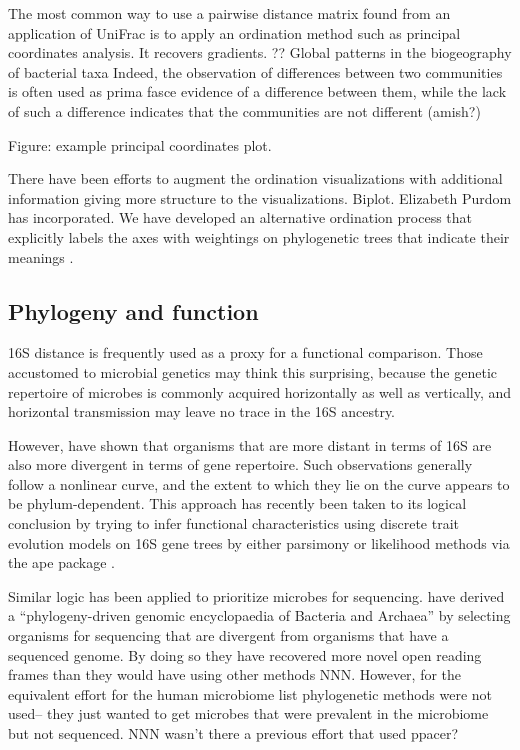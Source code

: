 \documentclass{amsart}
\begin{document}
The most common way to use a pairwise distance matrix found from an application of UniFrac is to apply an ordination method such as principal coordinates analysis.
It recovers gradients.
\citep{nemergut2011global}
?? Global patterns in the biogeography of bacterial taxa
Indeed, the observation of differences between two communities is often used as prima fasce evidence of a difference between them, while the lack of such a difference indicates that the communities are not different (amish?)

Figure: example principal coordinates plot.

There have been efforts to augment the ordination visualizations with additional information giving more structure to the visualizations.
Biplot.
Elizabeth Purdom \citep{BikEaMicrobiotaStomach06,PurdomAnalyzingDataGraphs08} has incorporated.
We have developed an alternative ordination process that explicitly labels the axes with weightings on phylogenetic trees that indicate their meanings \citep{matsen2013edge}.


\subsection{Phylogeny and function}

16S distance is frequently used as a proxy for a functional comparison.
Those accustomed to microbial genetics may think this surprising, because the genetic repertoire of microbes is commonly acquired horizontally as well as vertically, and horizontal transmission may leave no trace in the 16S ancestry.

However, \citep{zaneveld2010ribosomal} have shown that organisms that are more distant in terms of 16S are also more divergent in terms of gene repertoire.
Such observations generally follow a nonlinear curve, and the extent to which they lie on the curve appears to be phylum-dependent.
This approach has recently been taken to its logical conclusion by trying to infer functional characteristics using discrete trait evolution models on 16S gene trees \citep{langille2013predictive} by either parsimony \citep{kluge1969quantitative} or likelihood \citep{pagel1994detecting} methods via the ape package \citep{paradis2004ape}.

Similar logic has been applied to prioritize microbes for sequencing.
\citet{wu2009phylogeny} have derived a ``phylogeny-driven genomic encyclopaedia of Bacteria and Archaea'' by selecting organisms for sequencing that are divergent from organisms that have a sequenced genome.
By doing so they have recovered more novel open reading frames than they would have using other methods NNN.
However, for the equivalent effort for the human microbiome \cite{fodor2012most} list phylogenetic methods were not used-- they just wanted to get microbes that were prevalent in the microbiome but not sequenced.
NNN wasn't there a previous effort that used ppacer?
\end{document}
